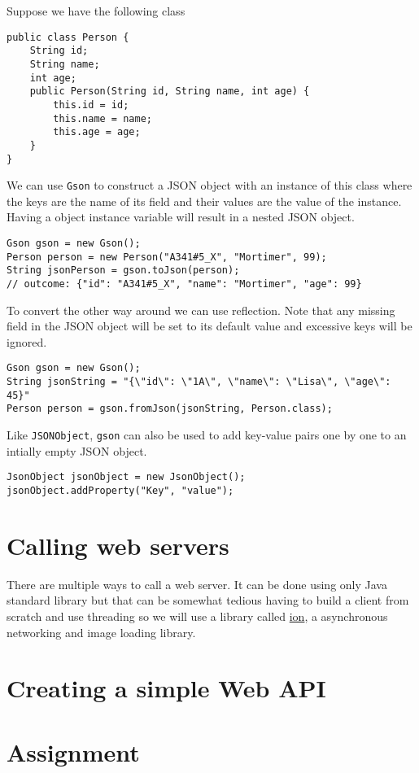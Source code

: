 Suppose we have the following class
\begin{lstlisting}[style=A_Java]
public class Person {
	String id;
	String name;
	int age;
	public Person(String id, String name, int age) {
		this.id = id;
		this.name = name;
		this.age = age;
	}
}
\end{lstlisting}
We can use \texttt{Gson} to construct a JSON object with an instance of this class where the keys are the name of its field and their values are the value of the instance. Having a object instance variable will result in a nested JSON object.
\begin{lstlisting}[style=A_Java]
Gson gson = new Gson();
Person person = new Person("A341#5_X", "Mortimer", 99);
String jsonPerson = gson.toJson(person);
// outcome: {"id": "A341#5_X", "name": "Mortimer", "age": 99}
\end{lstlisting}
To convert the other way around we can use reflection. Note that any missing field in the JSON object will be set to its default value and excessive keys will be ignored.
\begin{lstlisting}[style=A_Java]
Gson gson = new Gson();
String jsonString = "{\"id\": \"1A\", \"name\": \"Lisa\", \"age\": 45}"
Person person = gson.fromJson(jsonString, Person.class);
\end{lstlisting}
Like \texttt{JSONObject}, \texttt{gson} can also be used to add key-value pairs one by one to an intially empty JSON object.
\begin{lstlisting}[style=A_Java]
JsonObject jsonObject = new JsonObject();
jsonObject.addProperty("Key", "value");
\end{lstlisting}

\section{Calling web servers}
There are multiple ways to call a web server. It can be done using only Java standard library but that can be somewhat tedious having to build a client from scratch and use threading so we will use a library called \href{https://github.com/koush/ion}{ion}, a asynchronous networking and image loading library. 


\section{Creating a simple Web API}
\section{Assignment}

